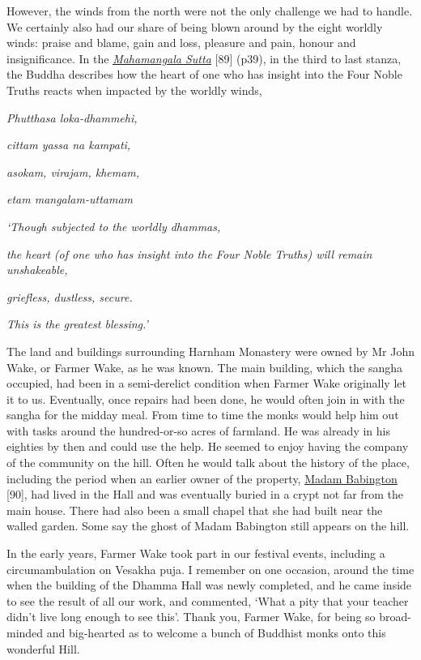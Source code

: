 However, the winds from the north were not the only challenge we had to
handle. We certainly also had our share of being blown around by the
eight worldly winds: praise and blame, gain and loss, pleasure and pain,
honour and insignificance. In the
\href{https://forestsangha.org/teachings/books/volume-2-suttas?language=English}{\emph{\underline{Mahamangala
Sutta}}} {[}89{]} (p39), in the third to last stanza, the Buddha
describes how the heart of one who has insight into the Four Noble
Truths reacts when impacted by the worldly winds,

\emph{Phutthasa loka-dhammehi,}

\emph{cittam yassa na kampati,}

\emph{asokam, virajam, khemam,}

\emph{etam mangalam-uttamam}

\emph{`Though subjected to the worldly dhammas,}

\emph{the heart (of one who has insight into the Four Noble Truths) will
remain unshakeable,}

\emph{griefless, dustless, secure.}

\emph{This is the greatest blessing.'}

The land and buildings surrounding Harnham Monastery were owned by Mr
John Wake, or Farmer Wake, as he was known. The main building, which the
sangha occupied, had been in a semi-derelict condition when Farmer Wake
originally let it to us. Eventually, once repairs had been done, he
would often join in with the sangha for the midday meal. From time to
time the monks would help him out with tasks around the hundred-or-so
acres of farmland. He was already in his eighties by then and could use
the help. He seemed to enjoy having the company of the community on the
hill. Often he would talk about the history of the place, including the
period when an earlier owner of the property,
\href{http://northeasthistorytour.blogspot.com/2015/09/the-dissenting-madam-babington-nz073804.html}{\underline{Madam
Babington}} {[}90{]}, had lived in the Hall and was eventually buried in
a crypt not far from the main house. There had also been a small chapel
that she had built near the walled garden. Some say the ghost of Madam
Babington still appears on the hill.

In the early years, Farmer Wake took part in our festival events,
including a circumambulation on Vesakha puja. I remember on one
occasion, around the time when the building of the Dhamma Hall was newly
completed, and he came inside to see the result of all our work, and
commented, `What a pity that your teacher didn't live long enough to see
this'. Thank you, Farmer Wake, for being so broad-minded and big-hearted
as to welcome a bunch of Buddhist monks onto this wonderful Hill.

